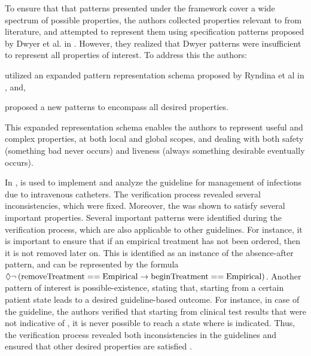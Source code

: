 To ensure that that patterns presented under the \MDA{} framework
cover a wide spectrum of possible properties, the authors
collected properties relevant to \BPGs{} from literature, and attempted
to represent them using specification patterns proposed by Dwyer et al.
in \cite{DwyerFM98}. However, they realized that Dwyer patterns
were insufficient to represent all properties of interest. To
address this the authors:
\begin{enumerate*}[label=(\alph*)]
  \item utilized an expanded pattern representation schema
    proposed by Ryndina et al in \cite{RyndinaThesis05}, and,
  \item proposed a new patterns to encompass all desired properties.
\end{enumerate*}
This expanded representation schema enables the authors to represent
useful and complex properties, at both local and global scopes, and
dealing with both safety (something bad never occurs) and liveness
(always something desirable eventually occurs).

In \cite{PorresECBS08}, \MDA{}
is used to implement and analyze the
\IRC{} guideline for management of infections due
to intravenous catheters. The verification process revealed
several inconsistencies, which were fixed. Moreover, the \CDSS{}
was shown to satisfy several important properties. Several
important patterns were identified during the verification process,
which are also applicable to other guidelines. For instance,
it is important to ensure
that if an empirical treatment has not been ordered, then
it is not removed later on. This is identified as
an instance of the absence-after pattern, and can
be represented by the \LTL{} formula
$\lozenge\neg\left(\text{removeTreatment} == \text{Empirical} \to
\text{beginTreatment} == \text{Empirical}\right)$.
Another pattern of interest is possible-existence, stating that,
starting from a certain patient
state leads to a desired guideline-based outcome. For instance,
in case of the \IRC{} guideline, the authors verified that
starting from clinical test results that were not indicative of
\IRC{}, it is never possible to reach a state where \IRC{} is indicated.
Thus, the verification process revealed both inconsistencies in the guidelines
and ensured that other desired properties are satisfied \cite{PerezJBI10}.

